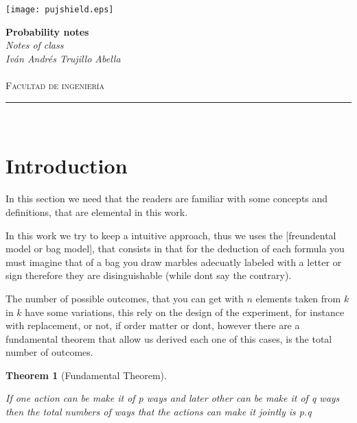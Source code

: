 \documentclass[10pt,a4paper]{article}
\author{Iván Andrés Trujillo }
\newtheorem{theorem}{Theorem}[section]
\begin{document}
\newcommand{\HRule}{\rule{\linewidth}{0.5mm}}


\texttt{[image: pujshield.eps]}\\[0.5cm] 

\begin{center} 
\textbf{\LARGE Probability notes}\\[0.2cm]
\emph{\LARGE Notes of class}\\[0.3cm] 
\emph{Iván Andrés Trujillo Abella} \\
\textsc{\Large 
}\\[0.2cm] 
\textsc{\large Facultad de ingeniería}\\[0.5cm] 
\HRule \\[0.4cm]
\end{center}
\vspace{1cm}






\section*{Introduction}

In this section we need that the readers are familiar with some concepts and definitions,  that are elemental in this work.

In this work we try to keep a intuitive approach, thus we uses the [freundental model or bag model], that consists in that for the deduction of each formula you must imagine that of a bag you draw marbles adecuatly labeled with a letter or sign  therefore they are disinguishable (while dont say the contrary). 





The number of possible outcomes, that you can get with $n$ elements taken from $k$ in $k$ have some variations, this rely on  the design of the experiment,  for instance with replacement, or not, if order matter or dont, however there are a fundamental theorem that allow us  derived  each one of this cases, is  the total number of outcomes.


\begin{theorem}[Fundamental Theorem]
\label{fundamental}

If one action can be make it of p ways and later other can be make it of q ways then the total numbers of ways that the actions can make it jointly is p.q


\end{theorem}
\end{document}
